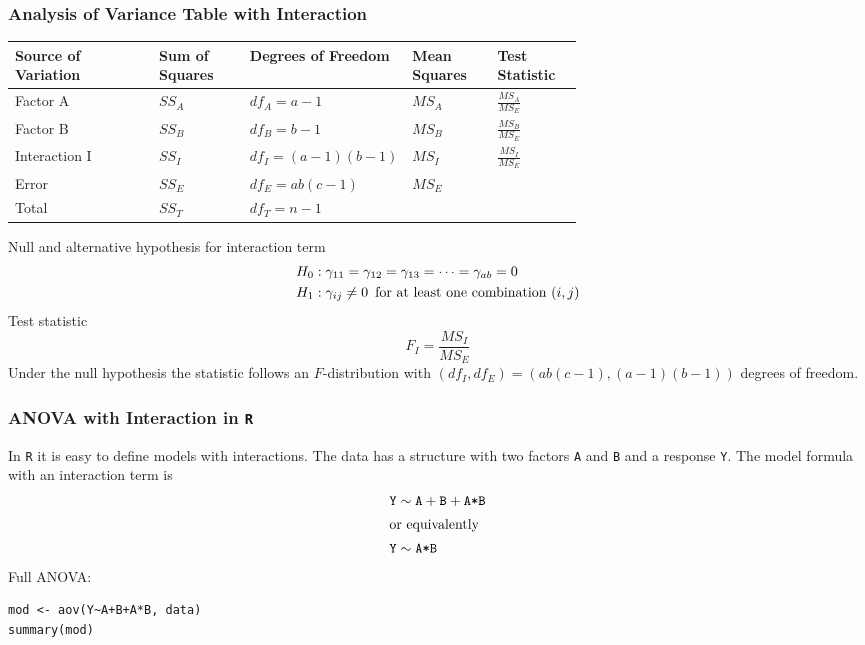\documentclass[11pt]{article}
\theoremstyle{definition}
\begin{document}
\subsubsection{Analysis of Variance Table with Interaction}
\begingroup
\renewcommand{\arraystretch}{1.6}
\begin{tabularx}{\linewidth}{X | p{0.16\linewidth} p{0.2\linewidth} p{0.15\linewidth} p{0.15\linewidth}}
	Source of Variation & Sum of Squares & Degrees of Freedom & Mean Squares & Test Statistic\\
	\hline
	Factor A & $SS_A$ & $df_A = a-1$ & $MS_A$ & $\frac{MS_A}{MS_E}$\\
	Factor B & $SS_B$ & $df_B = b-1$ & $MS_B$ & $\frac{MS_B}{MS_E}$\\
	Interaction I & $SS_I$ & $df_I = (a-1)(b-1)$ & $MS_I$ & $\frac{MS_I}{MS_E}$\\
	Error & $SS_E$ & $df_E = ab(c-1)$ & $MS_E$ & \\
	\hline
	Total & $SS_T$ & $df_T = n-1$ & &
\end{tabularx}
\endgroup
Null and alternative hypothesis for interaction term
\begin{align*}
	H_0 &: \gamma_{11} = \gamma_{12} = \gamma_{13} = \dots = \gamma_{ab} =0\\
	H_1 &: \gamma_{ij}\neq0\hspace*{0.5em}\text{for at least one combination $(i,j)$}
\end{align*}
Test statistic
\begin{equation*}
	F_I = \frac{MS_I}{MS_E}
\end{equation*}
Under the null hypothesis the statistic follows an $F$-distribution with $(df_I,df_E ) = \left(ab(c - 1),(a-1)(b-1)\right)$ degrees of freedom.

\subsubsection{ANOVA with Interaction in \texttt{R}}
In \texttt{R} it is easy to define models with interactions. The data has a structure with two factors \texttt{A} and \texttt{B} and a response \texttt{Y}. The model formula with an interaction term is
\begin{align*}
	\texttt{Y} &\sim \texttt{A} + \texttt{B} + \texttt{A*B}\\
	\intertext{or equivalently}
	\texttt{Y} &\sim \texttt{A*B}
\end{align*}
Full ANOVA:
\begin{verbatim}
mod <- aov(Y~A+B+A*B, data)
summary(mod)
\end{verbatim}
\end{document}
